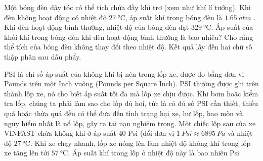\begin{ex}
	Một bóng đèn dây tóc có thể tích chứa đầy khí trơ (xem như khí lí tưởng). Khi đèn không hoạt động có nhiệt độ $\SI{27}{\celsius}$, áp suất khí trong bóng đèn là $\SI{1.65}{atm}$ . Khi đèn hoạt động bình thường, nhiệt độ của bóng đèn đạt $\SI{329}{\celsius}$. Áp suất của khối khí trong bóng đèn khi đèn hoạt động bình thường là bao nhiêu? Cho rằng thể tích của bóng đèn không thay đổi theo nhiệt độ. Kết quả lấy đến hai chữ số thập phân sau dấu phẩy.
\end{ex}
\begin{ex}
	PSI là chỉ số áp suất của không khí bị nén trong lốp xe, được đo bằng đơn vị Pounds trên một Inch vuông (Pounds per Square Inch). PSI thường được ghi trên thành lốp xe, nó cho biết áp suất tối đa mà lốp xe chịu được. Khi bơm hoặc kiểm tra lốp, chúng ta phải làm sao cho lốp đủ hơi, tức là có đủ số PSI cần thiết, thiếu quá hoặc thừa quá đều có thể đưa đến tình trạng hại xe, hư lốp, hao mòn và nguy hiểm nhất là nổ lốp, gây ra tai nạn nghiêm trọng. Một chiếc lốp sau của xe VINFAST chứa không khí ở áp suất 40 Psi (đổi đơn vị $\SI{1}{Psi} \approx \SI{6895}{Pa}$ và nhiệt độ $\SI{27}{\celsius}$. Khi xe chạy nhanh, lốp xe nóng lên làm nhiệt độ không khí trong lốp xe tăng lên tới $\SI{57}{\celsius}$. Áp suất khí trong lốp ở nhiệt độ này là bao nhiêu Psi
\end{ex}
